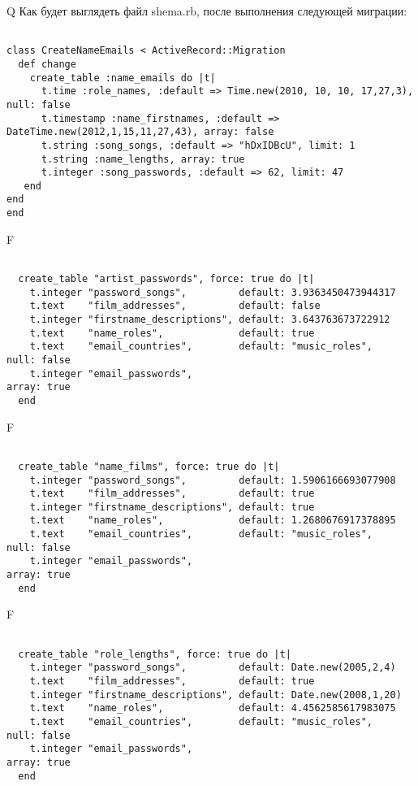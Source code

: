 Q
Как будет выглядеть файл shema.rb, после выполнения следующей миграции:

\begin{verbatim}

class CreateNameEmails < ActiveRecord::Migration 
  def change 
    create_table :name_emails do |t| 
      t.time :role_names, :default => Time.new(2010, 10, 10, 17,27,3), null: false
      t.timestamp :name_firstnames, :default => DateTime.new(2012,1,15,11,27,43), array: false
      t.string :song_songs, :default => "hDxIDBcU", limit: 1
      t.string :name_lengths, array: true
      t.integer :song_passwords, :default => 62, limit: 47
   end
end
end
\end{verbatim}

F
\begin{verbatim}

  create_table "artist_passwords", force: true do |t|
    t.integer "password_songs",         default: 3.9363450473944317
    t.text    "film_addresses",         default: false
    t.integer "firstname_descriptions", default: 3.643763673722912
    t.text    "name_roles",             default: true
    t.text    "email_countries",        default: "music_roles",        null: false
    t.integer "email_passwords",                                                    array: true
  end

\end{verbatim}

F
\begin{verbatim}

  create_table "name_films", force: true do |t|
    t.integer "password_songs",         default: 1.5906166693077908
    t.text    "film_addresses",         default: true
    t.integer "firstname_descriptions", default: true
    t.text    "name_roles",             default: 1.2680676917378895
    t.text    "email_countries",        default: "music_roles",        null: false
    t.integer "email_passwords",                                                    array: true
  end

\end{verbatim}

F
\begin{verbatim}

  create_table "role_lengths", force: true do |t|
    t.integer "password_songs",         default: Date.new(2005,2,4)
    t.text    "film_addresses",         default: true
    t.integer "firstname_descriptions", default: Date.new(2008,1,20)
    t.text    "name_roles",             default: 4.4562585617983075
    t.text    "email_countries",        default: "music_roles",        null: false
    t.integer "email_passwords",                                                    array: true
  end

\end{verbatim}

